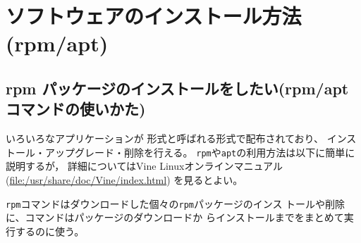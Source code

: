\documentclass{jreport}
\begin{document}
\chapter{ソフトウェアのインストール方法(rpm/apt)}


\section{rpm パッケージのインストールをしたい(rpm/apt コマンドの使いかた)}

いろいろなアプリケーションが  形式と呼ばれる形式で配布されており、
インストール・アップグレード・削除を行える。
\verb|rpm|や\verb|apt|の利用方法は以下に簡単に説明するが，
詳細についてはVine Linuxオンラインマニュアル
(\url{file:/usr/share/doc/Vine/index.html})
を見るとよい。

\verb|rpm|コマンドはダウンロードした個々の\verb|rpm|パッケージのインス
トールや削除に、コマンドはパッケージのダウンロードか
らインストールまでをまとめて実行するのに使う。
\end{document}
